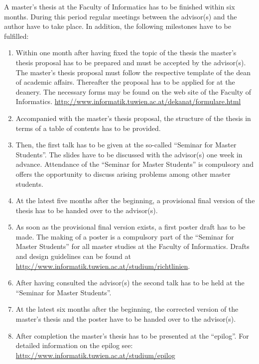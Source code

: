 A master's thesis at the Faculty of Informatics has to be finished within six months. During this period regular meetings between the advisor(s) and the author have to take place.
In addition, the following milestones have to be fulfilled:
\begin{enumerate}
  \item  Within one month after having fixed the topic of the thesis the master's thesis proposal has to be prepared and must be accepted by the advisor(s). The master's thesis proposal must follow the respective template of the dean of academic affairs. Thereafter the proposal has to be applied for at the deanery. The necessary forms may be found on the web site of the Faculty of Informatics. \url{http://www.informatik.tuwien.ac.at/dekanat/formulare.html}
  \item  Accompanied with the master's thesis proposal, the structure of the thesis in terms of a table of contents has to be provided.
  \item Then, the first talk has to be given at the so-called ``Seminar for Master Students''. The slides have to be discussed with the advisor(s) one week in advance. Attendance of the ``Seminar for Master Students'' is compulsory and offers the opportunity to discuss arising problems among other master students.
  \item At the latest five months after the beginning, a provisional final version of the thesis has to be handed over to the advisor(s).  
  \item As soon as the provisional final version exists, a first poster draft has to be made. The making of a poster is a compulsory part of the ``Seminar for Master Students'' for all master studies at the Faculty of Informatics. Drafts and design guidelines can be found at \url{http://www.informatik.tuwien.ac.at/studium/richtlinien}.
  \item After having consulted the advisor(s) the second talk has to be held at the ``Seminar for Master Students''.
  \item At the latest six months after the beginning, the corrected version of the master's thesis and the poster have to be handed over to the advisor(s).
  \item After completion the master's thesis has to be presented at the ``epilog''. For detailed information on the epilog see: \\ \url{http://www.informatik.tuwien.ac.at/studium/epilog}
\end{enumerate}

